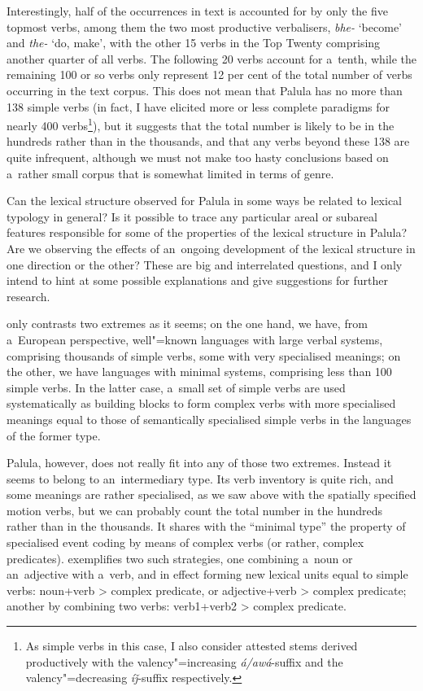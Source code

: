 Interestingly, half of the occurrences in text is accounted for by only the five topmost verbs, among them the two most productive verbalisers, \textit{bhe-} `become' and \textit{the-} `do, make', with the other 15 verbs in the Top Twenty comprising another quarter of all verbs. The following 20 verbs account for a~tenth, while the remaining 100 or so verbs only represent 12 per cent of the total number of verbs occurring in the text corpus. This does not mean that Palula has no more than 138 simple verbs (in fact, I have elicited more or less complete paradigms for nearly 400 verbs\footnote{As simple verbs in this case, I also consider attested stems derived productively with the valency"=increasing \textit{á/awá}-suffix and the valency"=decreasing \textit{íǰ}-suffix respectively.}), but it suggests that the total number is likely to be in the hundreds rather than in the thousands, and that any verbs beyond these 138 are quite infrequent, although we must not make too hasty conclusions based on a~rather small corpus that is somewhat limited in terms of genre.



Can the lexical structure observed for Palula in some ways be related to lexical typology in general? Is it possible to trace any particular areal or subareal features responsible for some of the properties of the lexical structure in Palula? Are we observing the effects of an~ongoing development of the lexical structure in one direction or the other? These are big and interrelated questions, and I only intend to hint at some possible explanations and give suggestions for further research.



\citet[409]{viberg2006} only contrasts two extremes as it seems; on the one hand, we have, from a~European perspective, well"=known languages with large verbal systems, comprising thousands of simple verbs, some with very specialised meanings; on the other, we have languages with minimal systems, comprising less than 100 simple verbs. In the latter case, a~small set of simple verbs are used systematically as building blocks to form complex verbs with more specialised meanings equal to those of semantically specialised simple verbs in the languages of the former type. 



Palula, however, does not really fit into any of those two extremes. Instead it seems to belong to an~intermediary type. Its verb inventory is quite rich, and some meanings are rather specialised, as we saw above with the spatially specified motion verbs, but we can probably count the total number in the hundreds rather than in the thousands. It shares with the ``minimal type'' the property of specialised event coding by means of complex verbs (or rather, complex predicates). \citet[348]{viberg2006} exemplifies two such strategies, one combining a~noun or an~adjective with a~verb, and in effect forming new lexical units equal to simple verbs: noun+verb {\textgreater} complex predicate, or adjective+verb {\textgreater} complex predicate; another by combining two verbs: verb1+verb2 {\textgreater} complex predicate. 



